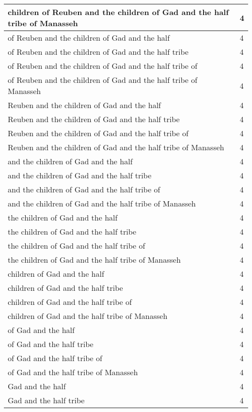 \begin{center}
\begin{longtable}{|p{3.0in}|p{0.5in}|}
children of Reuben and the children of Gad and the half tribe of Manasseh & 4\\ \hline 
of Reuben and the children of Gad and the half & 4\\ \hline 
of Reuben and the children of Gad and the half tribe & 4\\ \hline 
of Reuben and the children of Gad and the half tribe of & 4\\ \hline 
of Reuben and the children of Gad and the half tribe of Manasseh & 4\\ \hline 
Reuben and the children of Gad and the half & 4\\ \hline 
Reuben and the children of Gad and the half tribe & 4\\ \hline 
Reuben and the children of Gad and the half tribe of & 4\\ \hline 
Reuben and the children of Gad and the half tribe of Manasseh & 4\\ \hline 
and the children of Gad and the half & 4\\ \hline 
and the children of Gad and the half tribe & 4\\ \hline 
and the children of Gad and the half tribe of & 4\\ \hline 
and the children of Gad and the half tribe of Manasseh & 4\\ \hline 
the children of Gad and the half & 4\\ \hline 
the children of Gad and the half tribe & 4\\ \hline 
the children of Gad and the half tribe of & 4\\ \hline 
the children of Gad and the half tribe of Manasseh & 4\\ \hline 
children of Gad and the half & 4\\ \hline 
children of Gad and the half tribe & 4\\ \hline 
children of Gad and the half tribe of & 4\\ \hline 
children of Gad and the half tribe of Manasseh & 4\\ \hline 
of Gad and the half & 4\\ \hline 
of Gad and the half tribe & 4\\ \hline 
of Gad and the half tribe of & 4\\ \hline 
of Gad and the half tribe of Manasseh & 4\\ \hline 
Gad and the half & 4\\ \hline 
Gad and the half tribe & 4\\ \hline 

\end{longtable}
\end{center}
